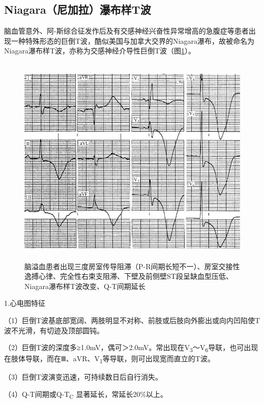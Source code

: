 \protect\hypertarget{text00012.htmlux5cux23subid89}{}{}

\subsection{Niagara（尼加拉）瀑布样T波}

脑血管意外、阿-斯综合征发作后及有交感神经兴奋性异常增高的急腹症等患者出现一种特殊形态的巨倒T波，酷似美国与加拿大交界的Niagara瀑布，故被命名为Niagara瀑布样T波，亦称为交感神经介导性巨倒T波（图\ref{fig6-2}）。

\begin{figure}[!htbp]
 \centering
 \includegraphics[width=4.95833in,height=4.01042in]{./images/Image00094.jpg}
 \captionsetup{justification=centering}
 \caption{脑溢血患者出现三度房室传导阻滞（P-R间期长短不一）、房室交接性逸搏心律、完全性右束支阻滞、下壁及前侧壁ST段呈缺血型压低、Niagara瀑布样T波改变、Q-T间期延长}
 \label{fig6-2}
  \end{figure} 

1.心电图特征

（1）巨倒T波基底部宽阔、两肢明显不对称、前肢或后肢向外膨出或向内凹陷使T波不光滑，有切迹及顶部圆钝。

（2）巨倒T波的深度多≥1.0mV，偶可＞2.0mV。常出现在V\textsubscript{3}～V\textsubscript{6}导联，也可出现在肢体导联，而在Ⅲ、aVR、V\textsubscript{1}等导联，则可出现宽而直立的T波。

（3）巨倒T波演变迅速，可持续数日后自行消失。

（4）Q-T间期或Q-T\textsubscript{C} 显著延长，常延长20\%以上。

